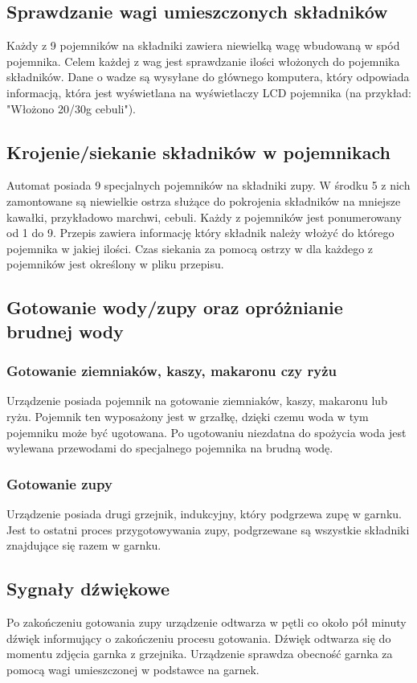 \documentclass[12pt,a4paper,notitlepage]{article}
\begin{document}
\subsection{Sprawdzanie wagi umieszczonych składników}
Każdy z 9 pojemników na składniki zawiera niewielką wagę wbudowaną w spód pojemnika. Celem każdej z wag jest sprawdzanie ilości włożonych do pojemnika składników. Dane o wadze są wysyłane do głównego komputera, który odpowiada informacją, która jest wyświetlana na wyświetlaczy LCD pojemnika (na przykład: "Włożono 20/30g cebuli").

\subsection{Krojenie/siekanie składników w pojemnikach}
Automat posiada 9 specjalnych pojemników na składniki zupy. W środku 5 z nich zamontowane są niewielkie ostrza służące do pokrojenia składników na mniejsze kawałki, przykładowo marchwi, cebuli. Każdy z pojemników jest ponumerowany od 1 do 9. Przepis zawiera informację który składnik należy włożyć do którego pojemnika w jakiej ilości. Czas siekania za pomocą ostrzy w dla każdego z pojemników jest określony w pliku przepisu.

\subsection{Gotowanie wody/zupy oraz opróżnianie brudnej wody}
\subsubsection{Gotowanie ziemniaków, kaszy, makaronu czy ryżu}
Urządzenie posiada pojemnik na gotowanie ziemniaków, kaszy, makaronu lub ryżu. Pojemnik ten wyposażony jest w grzałkę, dzięki czemu woda w tym pojemniku może być ugotowana. Po ugotowaniu niezdatna do spożycia woda jest wylewana przewodami do specjalnego pojemnika na brudną wodę.

\subsubsection{Gotowanie zupy}
Urządzenie posiada drugi grzejnik, indukcyjny, który podgrzewa zupę w garnku. Jest to ostatni proces przygotowywania zupy, podgrzewane są wszystkie składniki znajdujące się razem w garnku.

\subsection{Sygnały dźwiękowe}
Po zakończeniu gotowania zupy urządzenie odtwarza w pętli co około pół minuty dźwięk informujący o zakończeniu procesu gotowania. Dźwięk odtwarza się do momentu zdjęcia garnka z grzejnika. Urządzenie sprawdza obecność garnka za pomocą wagi umieszczonej w podstawce na garnek.
\end{document}
